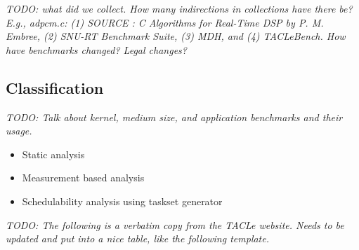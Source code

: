 \documentclass[a4paper,UKenglish]{oasics}
\newcommand{\todo}[1]{{\emph{TODO: #1}}}
\begin{document}
\todo{what did we collect. How many indirections in collections have there be?
E.g., adpcm.c: (1) SOURCE : C Algorithms for Real-Time DSP by P. M. Embree,
(2) SNU-RT Benchmark Suite, (3) MDH, and (4) TACLeBench. How have
benchmarks  changed? Legal changes?}

\subsection{Classification}

\todo{Talk about kernel, medium size, and application benchmarks and their usage.}
\begin{itemize}
\item Static analysis
\item Measurement based analysis
\item Schedulability analysis using taskset generator
\end{itemize}

\todo{The following is a verbatim copy from the TACLe website.
Needs to be updated and put into a nice table, like the following template.}
\end{document}

